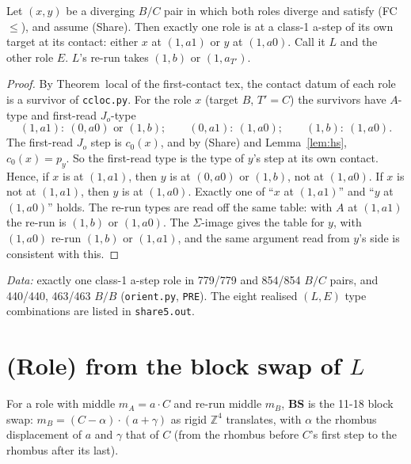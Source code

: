 \documentclass[11pt]{article}
\theoremstyle{definition}\newtheorem{definition}[theorem]{Definition}\newtheorem{remark}[theorem]{Remark}
\newcommand{\Z}{\mathbb Z}
\begin{document}
\begin{proposition}[orientation]\label{prop:orient}
Let $(x,y)$ be a diverging $B/C$ pair in which both roles diverge and satisfy \textup{(FC$\le$)}, and assume \textup{(Share)}. Then exactly one role is at a class-1 a-step of its own target at its contact: either $x$ at $(1,a1)$ or $y$ at $(1,a0)$. Call it $L$ and the other role $E$. $L$'s re-run takes $(1,b)$ or $(1,a_{T'})$.
\end{proposition}
\begin{proof}
By Theorem~local of the first-contact tex, the contact datum of each role is a survivor of \texttt{ccloc.py}. For the role $x$ (target $B$, $T'=C$) the survivors have $A$-type and first-read $J_o$-type
\[(1,a1):\ (0,a0)\text{ or }(1,b);\qquad (0,a1):\ (1,a0);\qquad (1,b):\ (1,a0).\]
The first-read $J_o$ step is $c_0(x)$, and by (Share) and Lemma~\ref{lem:hs}, $c_0(x)=p_y$. So the first-read type is the type of $y$'s step at its own contact. Hence, if $x$ is at $(1,a1)$, then $y$ is at $(0,a0)$ or $(1,b)$, not at $(1,a0)$. If $x$ is not at $(1,a1)$, then $y$ is at $(1,a0)$. Exactly one of ``$x$ at $(1,a1)$'' and ``$y$ at $(1,a0)$'' holds. The re-run types are read off the same table: with $A$ at $(1,a1)$ the re-run is $(1,b)$ or $(1,a0)$. The $\Sigma$-image gives the table for $y$, with $(1,a0)$ re-run $(1,b)$ or $(1,a1)$, and the same argument read from $y$'s side is consistent with this.
\end{proof}
\noindent\emph{Data:} exactly one class-1 a-step role in 779/779 and 854/854 $B/C$ pairs, and 440/440, 463/463 $B/B$ (\texttt{orient.py}, \texttt{PRE}). The eight realised $(L,E)$ type combinations are listed in \texttt{share5.out}.

\section{(Role) from the block swap of $L$}\label{sec:main}
For a role with middle $m_A=a\cdot C$ and re-run middle $m_B$, \textbf{BS} is the 11-18 block swap: $m_B=(C-\alpha)\cdot(a+\gamma)$ as rigid $\Z^4$ translates, with $\alpha$ the rhombus displacement of $a$ and $\gamma$ that of $C$ (from the rhombus before $C$'s first step to the rhombus after its last).
\end{document}
